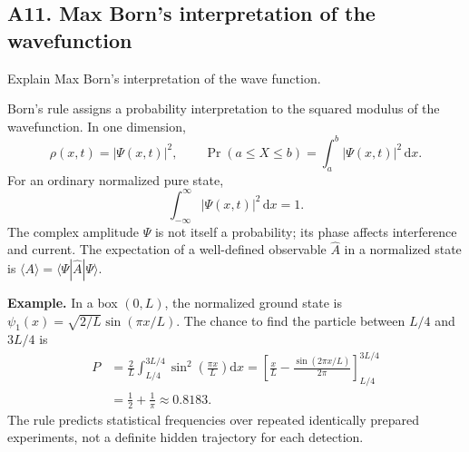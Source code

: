 \documentclass[11pt,a4paper]{article}
\newcommand{\dd}{\mathrm{d}}
\begin{document}
\subsection{A11. Max Born's interpretation of the wavefunction}
\begin{questionbox}Explain Max Born's interpretation of the wave function.\end{questionbox}
Born's rule assigns a probability interpretation to the squared modulus of the wavefunction. In one dimension,
\begin{equation}
\boxed{\rho(x,t)=|\Psi(x,t)|^2},\qquad
\boxed{\Pr(a\le X\le b)=\int_a^b|\Psi(x,t)|^2\,\dd x}.
\end{equation}
For an ordinary normalized pure state,
\begin{equation}
\boxed{\int_{-\infty}^{\infty}|\Psi(x,t)|^2\,\dd x=1}.
\end{equation}
The complex amplitude $\Psi$ is not itself a probability; its phase affects interference and current. The expectation of a well-defined observable $\hat A$ in a normalized state is $\langle A\rangle=\langle\Psi|\hat A|\Psi\rangle$.
\par\textbf{Example.} In a box $(0,L)$, the normalized ground state is $\psi_1(x)=\sqrt{2/L}\sin(\pi x/L)$. The chance to find the particle between $L/4$ and $3L/4$ is
\begin{align}
P&=\frac{2}{L}\int_{L/4}^{3L/4}\sin^2\!\left(\frac{\pi x}L\right)\dd x
=\left[\frac xL-\frac{\sin(2\pi x/L)}{2\pi}\right]_{L/4}^{3L/4}\\
&=\boxed{\frac12+\frac1\pi\approx0.8183}.
\end{align}
The rule predicts statistical frequencies over repeated identically prepared experiments, not a definite hidden trajectory for each detection.
\end{document}
